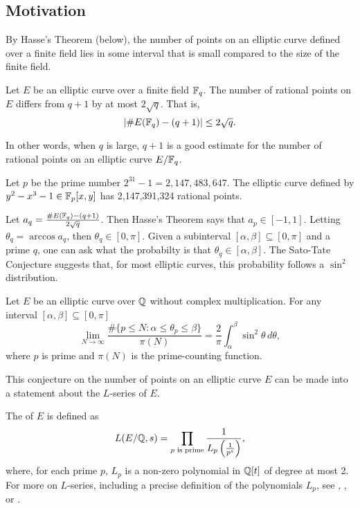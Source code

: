 \subsection{Motivation}

By Hasse's Theorem (below), the number of points on an elliptic curve defined over a finite field
lies in some interval that is small compared to the size of the finite field.
\begin{theorem}[Hasse]
  Let $E$ be an elliptic curve over a finite field $\mathbb{F}_q$.
  The number of rational points on $E$ differs from $q + 1$ by at most $2 \sqrt q$. That is,
  \[ | \#E(\mathbb{F}_q) - (q + 1) | \leq 2 \sqrt q. \]
\end{theorem}
In other words, when $q$ is large,
$q + 1$ is a good estimate for the number of rational points on an elliptic curve $E/\mathbb{F}_q$.

\begin{example}
  Let $p$ be the prime number $2^{31} - 1 = 2,147,483,647$.
  The elliptic curve defined by $y^2 - x^3 - 1 \in \mathbb{F}_p[x,y]$ has 2,147,391,324 rational points.
\end{example}

Let $a_q = \frac {\#E(\mathbb{F}_q) - (q + 1)} {2\sqrt q}$.
Then Hasse's Theorem says that $a_p \in [-1, 1]$.
Letting $\theta_q = \arccos a_q$, then $\theta_q \in [0, \pi]$.
Given a subinterval $[\alpha, \beta] \subseteq [0, \pi]$ and a prime $q$,
one can ask what the probabilty is that $\theta_q \in [\alpha, \beta]$.
The Sato-Tate Conjecture suggests that, for most elliptic curves, this probability follows a $\sin^2$ distribution.

\begin{conjecture}
  Let $E$ be an elliptic curve over $\mathbb{Q}$ without complex multiplication.
  For any interval $[\alpha, \beta] \subseteq [0, \pi]$
  \[ \lim_{N \to \infty}
    \frac {\#\{ p \leq N : \alpha \leq \theta_p \leq \beta \}} {\pi(N)} =
    \frac 2 \pi \int_{\alpha}^{\beta} \sin^2 \theta\,d\theta, \]
  where $p$ is prime and $\pi(N)$ is the prime-counting function.
\end{conjecture}

This conjecture on the number of points on an elliptic curve $E$
can be made into a statement about the $L$-series of $E$.
\begin{comment}
The $L$-series of curves are central to many conjectures in number theory.
A complete discussion of $L$-series is outside the scope of this thesis;
we present only enough to motivate the topic of this thesis.
Let $E$ be an elliptic curve defined over the rational numbers $\bb Q$,
meaning $E$ is defined by a polynomial in $\bb Q[x,y]$ of the form of Equation \ref{eq_elliptic}.
\end{comment}
The  of $E$ is defined as
\[ L(E/\mathbb{Q}, s)  = \prod_{p \text{ is prime}} \frac 1 {L_p \left( \frac 1 {p^s} \right)},\]
where, for each prime $p$, $L_p$ is a non-zero polynomial in $\mathbb{Q}[t]$ of degree at most 2.
For more on $L$-series, including a precise definition of the polynomials $L_p$,
see \cite{husemoller87}, \cite{milne06}, or \cite{silverman09}.

